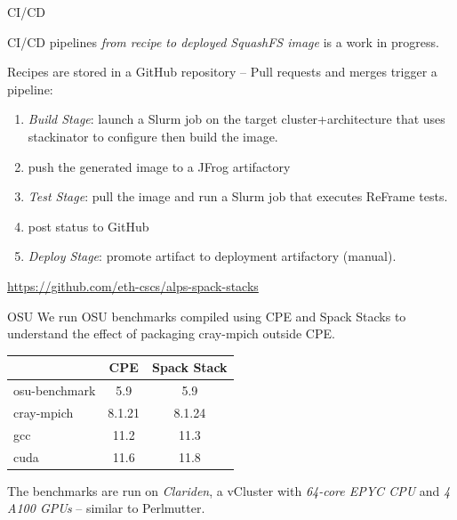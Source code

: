 \documentclass[aspectratio=43]{beamer}
\begin{document}
\begin{frame}[fragile]{CI/CD}
    \begin{center}
    CI/CD pipelines \emph{from recipe to deployed SquashFS image} is a work in progress.
    \end{center}

    \vspace{10pt}

    Recipes are stored in a GitHub repository -- Pull requests and merges trigger a pipeline:
    \begin{enumerate}
        \item \emph{\sc Build Stage}: launch a Slurm job on the target cluster+architecture that uses stackinator to configure then build the image.
        \item push the generated image to a JFrog artifactory
        \item \emph{\sc Test Stage}: pull the image and run a Slurm job that executes ReFrame tests.
        \item post status to GitHub
        \item \emph{\sc Deploy Stage}: promote artifact to deployment artifactory (manual).
    \end{enumerate}

    \url{https://github.com/eth-cscs/alps-spack-stacks}
\end{frame}


\begin{frame}[fragile]{OSU}
    We run OSU benchmarks compiled using CPE and Spack Stacks to understand the effect of packaging cray-mpich outside CPE.
\begin{center}
    \begin{tabular}{l |c  c }
                      & CPE   & Spack Stack \\
          \hline
        osu-benchmark & 5.9   & 5.9       \\
        cray-mpich    & 8.1.21& 8.1.24    \\
        gcc           & 11.2  & 11.3      \\
        cuda          & 11.6  & 11.8      \\
    \end{tabular}
\end{center}

    The benchmarks are run on \emph{Clariden}, a vCluster with \emph{64-core EPYC CPU} and  \emph{4 A100 GPUs} -- similar to Perlmutter.

\end{frame}
\end{document}
